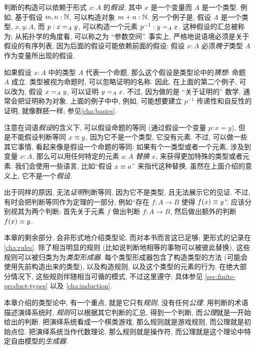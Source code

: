 %
判断的构造可以依赖于形式 $x:A$ 的\emph{假设}, 其中 $x$ 是一个变量而 $A$ 是一个类型.
例如, 基于假设 $m,n : \nat$, 可以构造对象 $m + n : \nat$.
另一个例子是, 假设 $A$ 是一个类型, $x,y : A$, 而  $p : \id[A]{x}{y}$, 可以构造一个元素 $p^{-1} : \id[A]{y}{x}$.
这种假设的汇总被称为;
从拓扑学的角度看, 可以称之为 ``参数空间''.
事实上, 严格地说语境必须是关于假设的有序列表, 因为后面的假设可能依赖前面的假设: 假设 $x:A$ 必须\emph{晚于}类型 $A$ 作为变量所出现的假设.

如果假设 $x:A$ 中的类型 $A$ 代表一个命题, 那么这个假设是类型论中的\emph{猜想}:
%
命题 $A$ 成立.
类型被视为命题时, 可以忽略证明的名称.
因此, 在上面的第二个例子, 可以改为, 假设 $\id[A]{x}{y}$, 可以证明 $\id[A]{y}{x}$.
不过, 因为做的是 ``关于证明的'' 数学,
%
通常会把证明称为对象.
上面的例子中中, 例如, 可能想要建立 $p^{-1}$ 传递性和自反性的证明, 就像群胚一样;
参见\cref{cha:basics}.

注意在词语\emph{假设}的含义下, 可以假设命题的等同 (通过假设一个变量 $p:x=y$), 但是不能假设判断等同 $x\jdeq y$, 因为它不是一个类型, 它没有元素.
不过, 可以做一些其它事情, 看起来像是假设一个命题的等同: 如果有个一类型或者一个元素, 涉及到变量 $x:A$, 那么可以用任何特定的元素 $a:A$ \emph{替换} $x$, 来获得更加特殊的类型或者元素.
我们会使用一些语言, 比如``假设 $x\jdeq a$'' 来指代这种替换, 虽然在上面介绍的意义上, 它不是一个\emph{假设}.
%
%

出于同样的原因, 无法\emph{证明}判断等同, 因为它不是类型, 且无法展示它的见证.
不过, 有时会把判断等同作为定理的一部分, 例如``存在 $f:A\to B$ 使得 $f(x)\jdeq y$''.
应该分别视其为两个判断: 首先关于元素 $f$ 做出判断  $f:A\to B$, 然后做出额外的判断 $f(x)\jdeq y$.

本章的剩余部分, 会非形式地介绍类型论, 而对本书而言这已足够;
更形式的记录在\cref{cha:rules}.
除了相当明显的规则 (比如说判断地相等的事物可以被彼此替换), 这些规则可以被归类为为\emph{类型形成器}.
每个类型形成器包含了构造类型的方法 (可能会使用先前构造出来的类型), 以及构造规则, 以及这个类型的元素的行为.
在绝大部分情况下, 这些规则伴随相当可循的模式, 不过这里遵守;
具体参见 \cref{sec:finite-product-types} 以及 \cref{cha:induction}.
%

%
%
本章介绍的类型论中, 有一个重点, 就是它只有\emph{规则}, 没有任何\emph{公理}.
用判断的术语描述演绎系统时, \emph{规则}可以根据其它判断的汇总, 得到一个判断, 而\emph{公理}就是一开始给出的判断.
把演绎系统看成一个棋类游戏, 那么规则就是游戏规则, 而公理就是初始点位.
把演绎系统当作代数理论, 那么规则就是操作符, 而公理就是这个理论中特定自由模型的\emph{生成器}.


